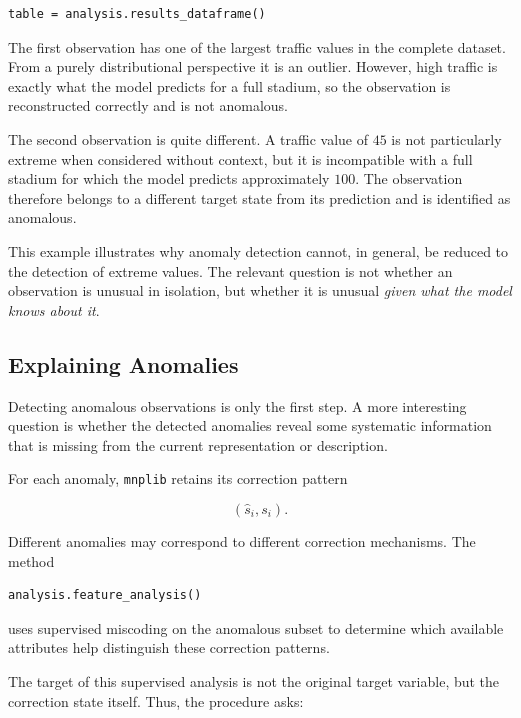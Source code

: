 \begin{example}
\begin{sourcecode}
{\begin{verbatim}
table = analysis.results_dataframe()
\end{verbatim}}
\end{sourcecode}

The first observation has one of the largest traffic values in the complete
dataset. From a purely distributional perspective it is an outlier. However,
high traffic is exactly what the model predicts for a full stadium, so the
observation is reconstructed correctly and is not anomalous.

The second observation is quite different. A traffic value of \(45\) is not
particularly extreme when considered without context, but it is incompatible
with a full stadium for which the model predicts approximately \(100\). The
observation therefore belongs to a different target state from its prediction
and is identified as anomalous.

This example illustrates why anomaly detection cannot, in general, be reduced
to the detection of extreme values. The relevant question is not whether an
observation is unusual in isolation, but whether it is unusual \emph{given what
the model knows about it}.
\end{example}

\subsection*{Explaining Anomalies}

Detecting anomalous observations is only the first step. A more interesting
question is whether the detected anomalies reveal some systematic information
that is missing from the current representation or description.

For each anomaly, \texttt{mnplib} retains its correction pattern

\[
(\widehat s_i,s_i).
\]

Different anomalies may correspond to different correction mechanisms. The
method

\begin{sourcecode}
{\scriptsize
\begin{verbatim}
analysis.feature_analysis()
\end{verbatim}}
\end{sourcecode}

uses supervised miscoding on the anomalous subset to determine which available
attributes help distinguish these correction patterns.

The target of this supervised analysis is not the original target variable, but
the correction state itself. Thus, the procedure asks:


